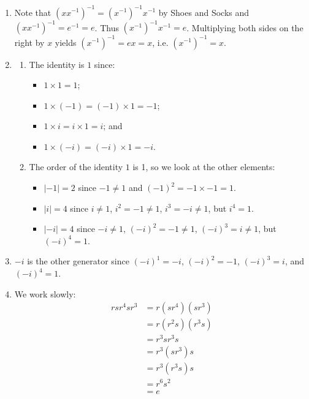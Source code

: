 \begin{enumerate}
    \item Note that $(xx^{-1})^{-1} = (x^{-1})^{-1}x^{-1}$ by Shoes and Socks and $(xx^{-1})^{-1} = e^{-1} = e$. Thus $(x^{-1})^{-1}x^{-1} = e$. Multiplying both sides on the right by $x$ yields $(x^{-1})^{-1} = ex = x$, i.e. $(x^{-1})^{-1} = x$.
    \item \begin{enumerate}[label=(\roman*)]
        \item The identity is $1$ since:
        \begin{itemize}
            \item $1 \times 1 = 1$;
            \item $1 \times (-1) = (-1) \times 1 = -1$;
            \item $1 \times i = i \times 1 = i$; and
            \item $1 \times (-i) = (-i) \times 1 = -i$.
        \end{itemize}
        \item The order of the identity $1$ is 1, so we look at the other elements:
        \begin{itemize}
            \item $|-1| = 2$ since $-1 \neq 1$ and $(-1)^2 = -1 \times -1 = 1$.
            \item $|i| = 4$ since $i \neq 1$, $i^2 = -1 \neq 1$, $i^3 = -i \neq 1$, but $i^4 = 1$.
            \item $|-i| = 4$ since $-i \neq 1$, $(-i)^2 = -1 \neq 1$, $(-i)^3 = i \neq 1$, but $(-i)^4 = 1$.
        \end{itemize}
    \end{enumerate}

    \item $-i$ is the other generator since $(-i)^1 = -i$, $(-i)^2 = -1$, $(-i)^3 = i$, and $(-i)^4 = 1$.

    \item We work slowly:
    \begin{align*}
        rsr^4sr^3 &= r(sr^4)(sr^3)\\
        &= r(r^2s)(r^3s)\\
        &= r^3sr^3s\\
        &= r^3(sr^3)s\\
        &= r^3(r^3s)s\\
        &= r^6s^2\\
        &= e
    \end{align*}
\end{enumerate}

